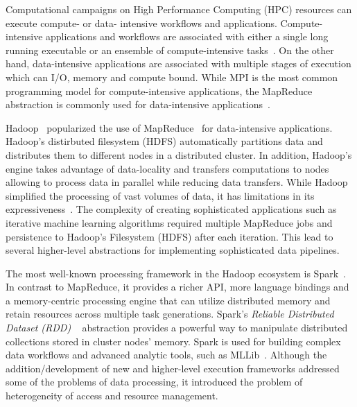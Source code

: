 \label{ch:pilot-data-hadoop}

Computational campaigns on High Performance Computing (HPC) resources can execute compute- or data- intensive workflows and applications.
Compute-intensive applications and workflows are associated with either a single long running executable or an ensemble of compute-intensive tasks~\cite{balasubramanian2018harnessing}.
On the other hand, data-intensive applications are associated with multiple stages of execution which can I/O, memory and compute bound.
While MPI is the most common programming model for compute-intensive applications, the MapReduce~\cite{dean2004mapreduce} abstraction is commonly used for data-intensive applications~\cite{hellerstein2012science}.


Hadoop~\cite{hadoop} popularized the use of MapReduce~\cite{dean2004mapreduce} for data-intensive applications.
Hadoop's distirbuted filesystem (HDFS) automatically partitions data and distributes them to different nodes in a distributed cluster.
In addition, Hadoop's engine takes advantage of data-locality and transfers computations to nodes allowing to process data in parallel while reducing data transfers.
While Hadoop simplified the processing of vast volumes of data, it has limitations in its expressiveness~\cite{yelick2011magellan,isard2007dryad}.
The complexity of creating sophisticated applications such as iterative machine learning algorithms required multiple MapReduce jobs and persistence to Hadoop's Filesystem (HDFS) after each iteration.
This lead to several higher-level abstractions for implementing sophisticated data pipelines.

The most well-known processing framework in the Hadoop ecosystem is Spark~\cite{zaharia2010spark}.
In contrast to MapReduce, it provides a richer API, more language bindings and a memory-centric processing engine that can utilize distributed memory and retain resources across multiple task generations.
Spark's \emph{Reliable Distributed Dataset (RDD)} ~\cite{zaharia2012resilient} abstraction provides a powerful way to manipulate distributed collections stored in cluster nodes' memory.
Spark is used for building complex data workflows and advanced analytic tools, such as MLLib~\cite{mllib}.
Although the addition/development of new and higher-level execution frameworks addressed some of the problems of data processing, it introduced the problem of heterogeneity of access and resource management.

